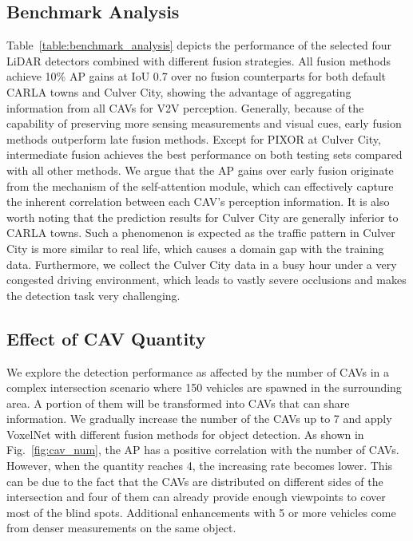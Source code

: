 \documentclass[letterpaper, 10 pt, conference]{ieeeconf}
\begin{document}
\subsection{Benchmark Analysis}
Table~\ref{table:benchmark_analysis} depicts the performance of the selected four LiDAR detectors combined with different fusion strategies. All fusion methods achieve 10\% AP gains at IoU 0.7 over no fusion counterparts for both default CARLA towns and Culver City, showing the advantage of aggregating information from all CAVs for V2V perception. Generally, because of the capability of preserving more sensing measurements and visual cues, early fusion methods outperform late fusion methods. Except for PIXOR at Culver City, intermediate fusion achieves the best performance on both testing sets compared with all other methods. We argue that the AP gains over early fusion originate from the mechanism of the self-attention module, which can effectively capture the inherent correlation between each CAV's perception information. It is also worth noting that the prediction results for Culver City are generally inferior to CARLA towns. Such a phenomenon is expected as the traffic pattern in Culver City is more similar to real life, which causes a domain gap with the training data. Furthermore, we collect the Culver City data in a busy hour under a very congested driving environment, which leads to vastly severe occlusions and makes the detection task very challenging.


\subsection{Effect of CAV Quantity}
We explore the detection performance as affected by the number of CAVs in a complex intersection scenario where 150 vehicles are spawned in the surrounding area. A portion of them will be transformed into CAVs that can share information. We gradually increase the number of the CAVs up to 7 and apply VoxelNet with different fusion methods for object detection. As shown in Fig.~\ref{fig:cav_num}, the AP has a positive correlation with the number of CAVs. However, when the quantity reaches 4, the increasing rate becomes lower. This can be due to the fact that the CAVs are distributed on different sides of the intersection and four of them can already provide enough viewpoints to cover most of the blind spots. Additional enhancements with 5 or more vehicles come from denser measurements on the same object.
\end{document}
